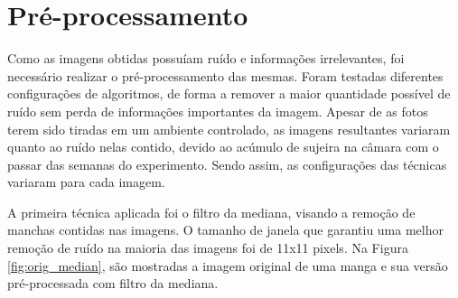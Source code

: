 \section{Pré-processamento}

Como as imagens obtidas possuíam ruído e informações irrelevantes, foi necessário realizar o pré-processamento das mesmas. Foram testadas diferentes configurações de algoritmos, de forma a remover a maior quantidade possível de ruído sem perda de informações importantes da imagem. Apesar de as fotos terem sido tiradas em um ambiente controlado, as imagens resultantes variaram quanto ao ruído nelas contido, devido ao acúmulo de sujeira na câmara com o passar das semanas do experimento. Sendo assim, as configurações das técnicas variaram para cada imagem.

A primeira técnica aplicada foi o filtro da mediana, visando a remoção de manchas contidas nas imagens. O tamanho de janela que garantiu uma melhor remoção de ruído na maioria das imagens foi de 11x11 pixels. Na Figura \ref{fig:orig_median}, são mostradas a imagem original de uma manga e sua versão pré-processada com filtro da mediana.


